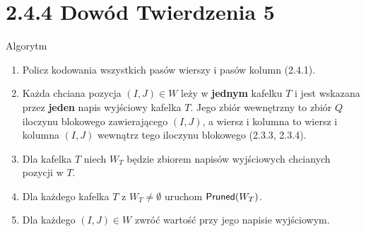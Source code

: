\section{2.4.4 Dowód Twierdzenia 5}

\begin{frame}{Algorytm}
  \begin{enumerate}
    \item Policz kodowania wszystkich pasów wierszy i pasów kolumn (2.4.1).
    \item<2-> Każda chciana pozycja $(I,J)\in W$ leży w \textbf{jednym} kafelku $T$ i jest wskazana przez \textbf{jeden} napis
      wyjściowy kafelka $T$. Jego zbiór wewnętrzny to zbiór $Q$ iloczynu blokowego zawierającego $(I,J)$, a wiersz i kolumna to wiersz
      i kolumna $(I,J)$ wewnątrz tego iloczynu blokowego (2.3.3, 2.3.4).
    \item<3-> Dla kafelka $T$ niech $W_T$ będzie zbiorem napisów wyjściowych chcianych pozycji w $T$.
    \item<4-> Dla każdego kafelka $T$ z $W_T\ne\emptyset$ uruchom $\mathsf{Pruned}(W_T)$.
    \item<5-> Dla każdego $(I,J)\in W$ zwróć wartość przy jego napisie wyjściowym.
  \end{enumerate}
\end{frame}

